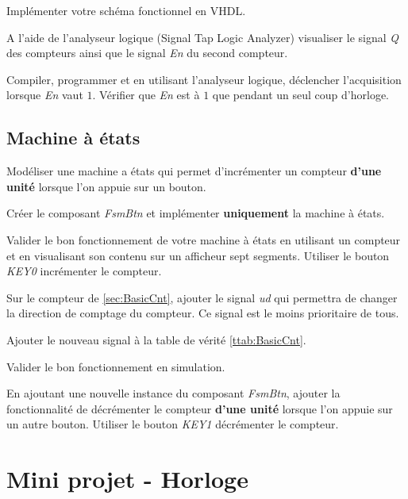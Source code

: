 \medskip

Implémenter votre schéma fonctionnel en VHDL.

\medskip

A l'aide de l'analyseur logique (Signal Tap Logic Analyzer) visualiser le signal \textit{Q} des compteurs ainsi que le signal \textit{En} du second compteur. 

\medskip

Compiler, programmer et en utilisant l'analyseur logique, déclencher l'acquisition lorsque \textit{En} vaut $1$. Vérifier que \textit{En} est à $1$ que pendant un seul coup d'horloge.


\subsection{Machine à états}
Modéliser une machine a états qui permet d'incrémenter un compteur \textbf{d'une unité} lorsque l'on appuie sur un bouton.

\medskip

Créer le composant \textit{FsmBtn} et implémenter \textbf{uniquement} la machine à états.

\medskip

Valider le bon fonctionnement de votre machine à états en utilisant un compteur et en visualisant son contenu sur un afficheur sept segments. Utiliser le bouton \textit{KEY0} incrémenter le compteur.

\medskip

Sur le compteur de \ref{sec:BasicCnt}, ajouter le signal \textit{ud} qui permettra de changer la direction de comptage du compteur. Ce signal est le moins prioritaire de tous.

\medskip

Ajouter le nouveau signal à la table de vérité \ref{ttab:BasicCnt}.

\medskip

Valider le bon fonctionnement en simulation.

\medskip

En ajoutant une nouvelle instance du composant \textit{FsmBtn}, ajouter la fonctionnalité de décrémenter le compteur \textbf{d'une unité} lorsque l'on appuie sur un autre bouton. Utiliser le bouton \textit{KEY1} décrémenter le compteur.

\section{Mini projet - Horloge}


